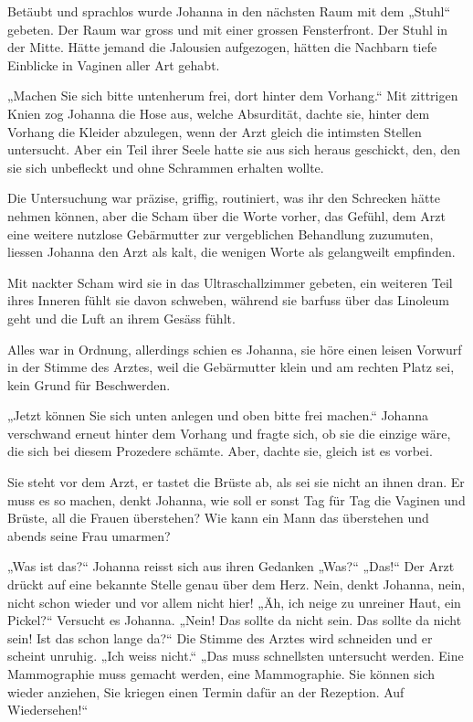 \documentclass[10pt,titlepage,a5paper]{book}
\begin{document}
Betäubt und sprachlos wurde Johanna in den nächsten Raum mit dem „Stuhl“ gebeten. Der Raum war gross und mit  einer grossen Fensterfront. Der Stuhl in der Mitte. Hätte jemand die Jalousien aufgezogen, hätten die Nachbarn tiefe Einblicke in Vaginen aller Art gehabt.

„Machen Sie sich bitte untenherum frei, dort hinter dem Vorhang.“ Mit zittrigen Knien zog Johanna die Hose aus, welche Absurdität, dachte sie, hinter dem Vorhang die Kleider abzulegen, wenn der Arzt gleich die intimsten Stellen untersucht. Aber ein Teil ihrer Seele hatte sie aus sich heraus geschickt, den, den sie sich unbefleckt und ohne Schrammen erhalten wollte.

Die Untersuchung war präzise, griffig, routiniert, was ihr den Schrecken hätte nehmen können, aber die Scham über die Worte vorher, das Gefühl, dem Arzt eine weitere nutzlose Gebärmutter zur vergeblichen Behandlung zuzumuten, liessen Johanna den Arzt als kalt, die wenigen Worte als gelangweilt empfinden.

Mit nackter Scham wird sie in das Ultraschallzimmer gebeten, ein weiteren Teil ihres Inneren fühlt sie davon schweben, während sie barfuss über das Linoleum geht  und die Luft an ihrem Gesäss fühlt.

Alles war in Ordnung, allerdings schien es Johanna, sie höre einen leisen Vorwurf in der Stimme des Arztes, weil die Gebärmutter klein und am rechten Platz sei, kein Grund für Beschwerden.

„Jetzt können Sie sich unten anlegen und oben bitte frei machen.“ Johanna verschwand erneut hinter dem Vorhang und fragte sich, ob sie die einzige wäre, die sich bei diesem Prozedere schämte. Aber, dachte sie, gleich ist es vorbei. 

Sie steht vor dem Arzt, er tastet die Brüste ab, als sei sie nicht an ihnen dran. Er muss es so machen, denkt Johanna, wie soll er sonst Tag für Tag die Vaginen und Brüste, all die Frauen überstehen? Wie kann ein Mann das überstehen und abends seine Frau umarmen?

„Was ist das?“ Johanna reisst sich aus ihren Gedanken „Was?“ „Das!“ Der Arzt drückt auf eine bekannte Stelle genau über dem Herz. Nein, denkt Johanna, nein, nicht schon wieder und vor allem nicht hier! „Äh, ich neige zu unreiner Haut, ein Pickel?“ Versucht es Johanna. „Nein! Das sollte da nicht sein. Das sollte da nicht sein! Ist das schon lange da?“ Die Stimme des Arztes wird schneiden und er scheint unruhig. „Ich weiss nicht.“ „Das muss schnellsten untersucht werden. Eine Mammographie muss gemacht werden, eine Mammographie. Sie können sich wieder anziehen, Sie kriegen einen Termin dafür an der Rezeption. Auf Wiedersehen!“
\end{document}

